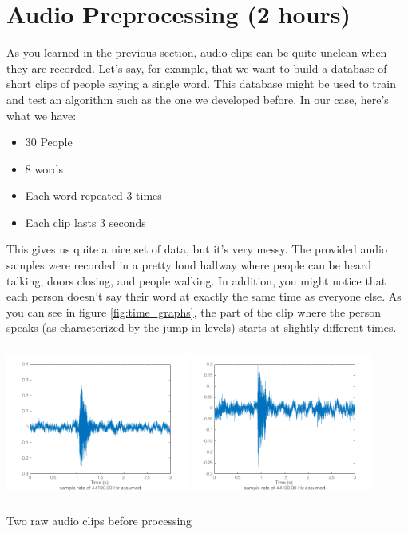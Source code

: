 \documentclass{tufte-handout}
\begin{document}
\section{Audio Preprocessing (2 hours)}

As you learned in the previous section, audio clips can be quite unclean when they are recorded. Let's say, for example, that we want to build a database of short clips of people saying a single word. This database might be used to train and test an algorithm such as the one we developed before. In our case, here's what we have:
\begin{itemize}
	\item 30 People
	\item 8 words
	\item Each word repeated 3 times
	\item Each clip lasts 3 seconds
\end{itemize}
This gives us quite a nice set of data, but it's very messy. The provided audio samples were recorded in a pretty loud hallway where people can be heard talking, doors closing, and people walking. In addition, you might notice that each person doesn't say their word at exactly the same time as everyone else. As you can see in figure \ref{fig:time_graphs}, the part of the clip where the person speaks (as characterized by the jump in levels) starts at slightly different times.
\begin{marginfigure}
	\includegraphics[width = 6cm, height = 5cm]{time_1.png}
	\includegraphics[width = 6cm, height = 5cm]{time_2.png}
	\caption{Two raw audio clips before processing}
	\label{fig:time_graphs}
\end{marginfigure}
\end{document}
